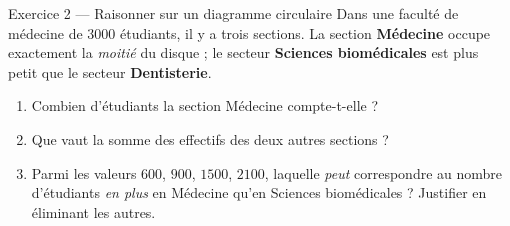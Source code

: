 \documentclass[11pt,a4paper]{article}
\begin{document}
\begin{exobox}{Exercice 2 — Raisonner sur un diagramme circulaire}
Dans une faculté de médecine de $3000$ étudiants, il y a trois sections. La section \textbf{Médecine}
occupe exactement la \emph{moitié} du disque ; le secteur \textbf{Sciences biomédicales} est plus
petit que le secteur \textbf{Dentisterie}.
\begin{center}
\end{center}
\begin{enumerate}[label=\textbf{(\alph*)}]
  \item Combien d'étudiants la section Médecine compte-t-elle ?
  \item Que vaut la somme des effectifs des deux autres sections ?
  \item Parmi les valeurs $600$, $900$, $1500$, $2100$, laquelle \emph{peut} correspondre au nombre
        d'étudiants \emph{en plus} en Médecine qu'en Sciences biomédicales ? Justifier en éliminant
        les autres.
\end{enumerate}
\end{exobox}
\end{document}
